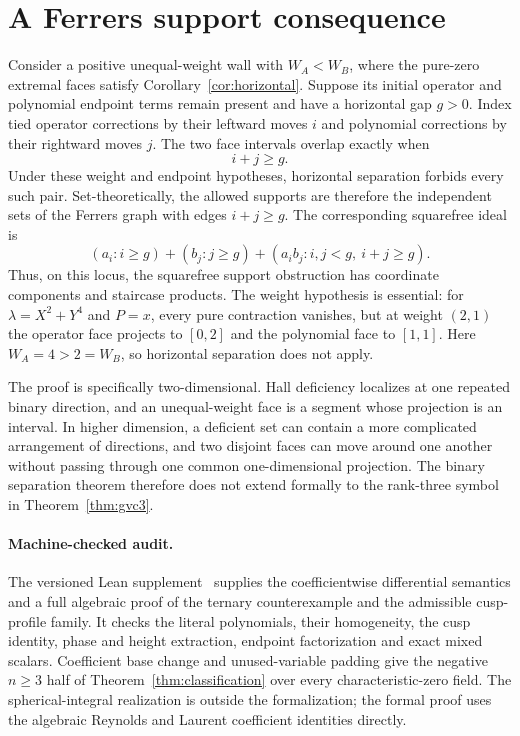 \documentclass[11pt]{article}
\begin{document}
\section{A Ferrers support consequence}

Consider a positive unequal-weight wall with $W_A<W_B$, where the
pure-zero extremal faces satisfy Corollary~\ref{cor:horizontal}.
Suppose its initial operator and polynomial endpoint terms remain present
and have a horizontal gap $g>0$.  Index tied operator corrections by their leftward moves $i$ and polynomial
corrections by their rightward moves $j$.  The two face intervals overlap
exactly when
\[
 i+j\geq g.
\]
Under these weight and endpoint hypotheses, horizontal separation forbids
every such pair.  Set-theoretically, the
allowed supports are therefore the independent sets of the Ferrers graph
with edges $i+j\geq g$.  The corresponding squarefree ideal is
\[
 (a_i:i\geq g)+(b_j:j\geq g)
 +(a_i b_j:i,j<g,\ i+j\geq g).
\]
Thus, on this locus, the squarefree support obstruction has coordinate
components and staircase products.  The weight hypothesis is essential:
for $\lambda=X^2+Y^4$ and $P=x$, every pure contraction vanishes,
but at weight $(2,1)$ the operator face projects to $[0,2]$ and the
polynomial face to $[1,1]$.  Here $W_A=4>2=W_B$, so horizontal
separation does not apply.

The proof is specifically two-dimensional.  Hall deficiency localizes at
one repeated binary direction, and an unequal-weight face is a segment
whose projection is an interval.  In higher dimension, a deficient set can
contain a more complicated arrangement of directions, and two disjoint
faces can move around one another without passing through one common
one-dimensional projection.  The binary separation theorem therefore does
not extend formally to the rank-three symbol in
Theorem~\ref{thm:gvc3}.

\paragraph{Machine-checked audit.}
The versioned Lean supplement~\cite{FormalGVC} supplies the coefficientwise
differential semantics and a full algebraic proof of the ternary
counterexample and the admissible cusp-profile family.  It checks the
literal polynomials, their homogeneity, the cusp identity, phase and height
extraction, endpoint factorization and exact mixed scalars.  Coefficient
base change and unused-variable padding give the negative
$n\geq3$ half of Theorem~\ref{thm:classification} over every
characteristic-zero field.  The spherical-integral realization is outside
the formalization; the formal proof uses the algebraic Reynolds and
Laurent coefficient identities directly.
\end{document}
